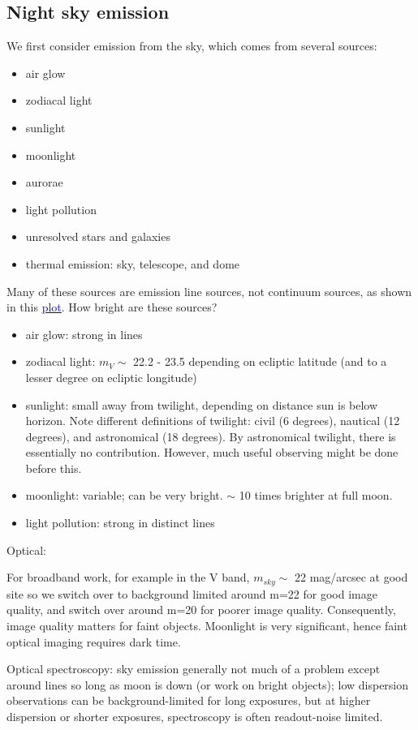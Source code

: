 \documentclass[12pt]{article}
\begin{document}
\subsection*{Night sky emission}
We first consider emission from the sky, which comes from several
sources:
\begin{itemize}
    \item air glow
    \item zodiacal light
    \item sunlight
    \item moonlight
    \item aurorae
    \item light pollution
    \item unresolved stars and galaxies
    \item thermal emission: sky, telescope, and dome
\end{itemize}
Many of these sources are emission line sources, not continuum
sources, as shown in this
\href{http://astronomy.nmsu.edu/holtz/a535/html/diagrams/a535/skyemiss.htm}
{\textcolor{blue}{plot}}.
How bright are these sources?
\begin{itemize}
    \item air glow: strong in lines
    \item zodiacal light: $m_V \sim$ 22.2 - 23.5 depending on ecliptic
    latitude (and to a lesser degree on ecliptic longitude)
    \item sunlight: small away from twilight, depending on distance sun
    is below horizon. Note different definitions of twilight: civil (6
    degrees), nautical (12 degrees), and astronomical (18 degrees). By
    astronomical twilight, there is essentially no contribution.
    However, much useful observing might be done before this.
    \item moonlight: variable; can be very bright. $\sim$ 10 times
    brighter at full moon.
    \item light pollution: strong in distinct lines
\end{itemize}
Optical:

For broadband work, for example in the V band, $m_{sky}\sim$ 22
mag/arcsec at good site so we switch over to background limited around
m=22 for good image quality, and switch over around m=20 for poorer image
quality. Consequently, image quality matters for faint objects.
Moonlight is very significant, hence faint optical imaging requires
dark time. 

Optical spectroscopy: sky emission generally not much of a problem
except around lines so long as moon is down (or work on bright
objects); low dispersion observations can be background-limited for
long exposures, but at higher dispersion or shorter exposures,
spectroscopy is often readout-noise limited.
\end{document}
